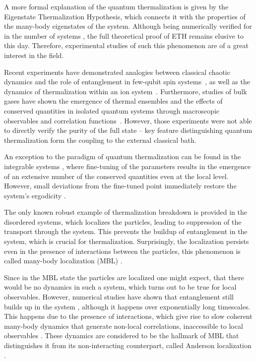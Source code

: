 A more formal explanation of the quantum thermalization is given by the Eigenstate Thermalization Hypothesis, which connects it with the properties of the many-body eigenstates of the system. Although being numerically verified for in the number of systems \cite{ Olshanii2008, Phys. Rev. E 86, 010102(R), DAlessio2015, Phys. Rev. B 91, 155123}, the full theoretical proof of ETH remains elusive to this day. Therefore, experimental studies of such this phenomenon are of a great interest in the field.

Recent experiments have demonstrated analogies between classical chaotic dynamics and the role of entanglement in few-qubit spin systems~\cite{Martinis2016}, as well as the dynamics of thermalization within an ion system~\cite{Schaetz2015}. Furthermore, studies of bulk gases have shown the emergence of thermal ensembles and the effects of conserved quantities in isolated quantum systems through macroscopic observables and correlation functions~\cite{Trotzky2012,Langen2013,Geiger2014,Langen2015}. However, those experiments were not able to directly verify the purity of the full state -- key feature distinguishing quantum thermalization form the coupling to the external classical bath.

An exception to the paradigm of quantum thermalization can be found in the integrable systems \cite{ Phys. Rev. Lett. 100, 210403 (2008)}, where fine-tuning of the parameters results in the emergence of an extensive number of the conserved quantities even at the local level. However, small deviations from the fine-tuned point immediately restore the system’s ergodicity \cite{ Phys. Rev. X 8, 021030}.

The only known robust example of thermalization breakdown is provided in the disordered systems, which localizes the particles\cite{ Anderson1958}, leading to suppression of the transport through the system. This prevents the buildup of entanglement in the system, which is crucial for thermalization. Surprisingly, the localization persists even in the presence of interactions between the particles, this phenomenon is called many-body localization (MBL) \cite{ Anderson1958, Gornyi2005, Basko2006, Oganesyan2007}.

Since in the MBL state the particles are localized one might expect, that there would be no dynamics in such a system, which turns out to be true for local observables. However, numerical studies have shown that entanglement still builds up in the system \cite{Znidaric2008, Bardarson2012}, although it happens over exponentially long timescales. This happens due to the presence of interactions, which give rise to slow coherent many-body dynamics that generate non-local correlations, inaccessible to local observables \cite{Serbyn2013, Serbyn2013a, Huse2014}. These dynamics are considered to be the hallmark of MBL that distinguishes it from its non-interacting counterpart, called Anderson localization \cite{Anderson1958}.

